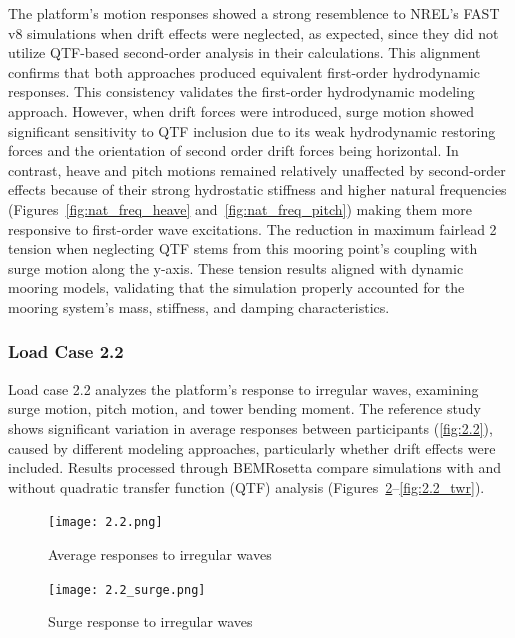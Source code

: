 \documentclass[a4paper, 11pt]{article}
\begin{document}
The platform's motion responses showed a strong resemblence to NREL's FAST v8 simulations when drift effects were neglected, as expected, since they did not utilize QTF-based second-order analysis in their calculations. This alignment confirms that both approaches produced equivalent first-order hydrodynamic responses. This consistency validates the first-order hydrodynamic modeling approach. However, when drift forces were introduced, surge motion showed significant sensitivity to QTF inclusion due to its weak hydrodynamic restoring forces and the orientation of second order drift forces being horizontal. In contrast, heave and pitch motions remained relatively unaffected by second-order effects because of their strong hydrostatic stiffness and higher natural frequencies (Figures~\ref{fig:nat_freq_heave} and~\ref{fig:nat_freq_pitch}) making them more responsive to first-order wave excitations. The reduction in maximum fairlead 2 tension when neglecting QTF stems from this mooring point's coupling with surge motion along the y-axis. These tension results aligned with dynamic mooring models, validating that the simulation properly accounted for the mooring system's mass, stiffness, and damping characteristics.

\subsubsection{Load Case 2.2}

\hspace{0.5cm}Load case 2.2 analyzes the platform's response to irregular waves, examining surge motion, pitch motion, and tower bending moment. The reference study shows significant variation in average responses between participants (\autoref{fig:2.2}), caused by different modeling approaches, particularly whether drift effects were included. Results processed through BEMRosetta compare simulations with and without quadratic transfer function (QTF) analysis (Figures~\ref{fig:2.2_surge}--\ref{fig:2.2_twr}). 

\begin{figure}[H]
    \centering
    \texttt{[image: 2.2.png]}
    \caption{\small Average responses to irregular waves \cite{Robertson2014}}
    \label{fig:2.2}
\end{figure}

\begin{figure}[H]
    \centering
    \texttt{[image: 2.2\_surge.png]}
    \caption{\small Surge response to irregular waves}
    \label{fig:2.2_surge}
\end{figure}
\end{document}
